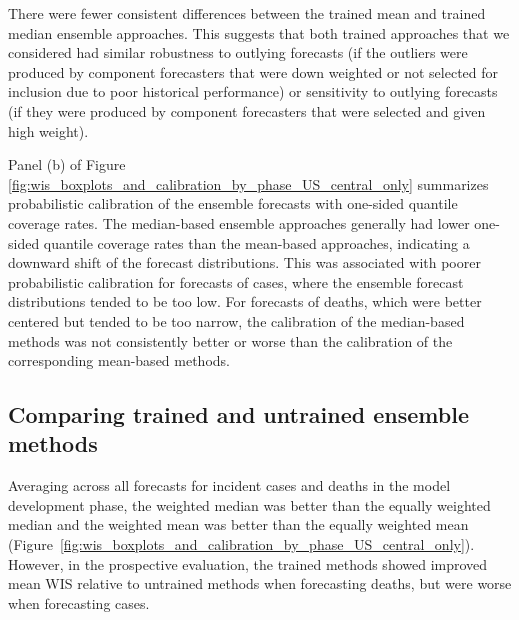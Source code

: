 \documentclass[11pt,3p,review,authoryear]{elsarticle}
\begin{document}
There were fewer consistent differences between the trained mean and trained median ensemble approaches. This suggests that both trained approaches that we considered had similar robustness to outlying forecasts (if the outliers were produced by component forecasters that were down weighted or not selected for inclusion due to poor historical performance) or sensitivity to outlying forecasts (if they were produced by component forecasters that were selected and given high weight).

Panel (b) of Figure \ref{fig:wis_boxplots_and_calibration_by_phase_US_central_only} summarizes probabilistic calibration of the ensemble forecasts with one-sided quantile coverage rates. The median-based ensemble approaches generally had lower one-sided quantile coverage rates than the mean-based approaches, indicating a downward shift of the forecast distributions. This was associated with poorer probabilistic calibration for forecasts of cases, where the ensemble forecast distributions tended to be too low. For forecasts of deaths, which were better centered but tended to be too narrow, the calibration of the median-based methods was not consistently better or worse than the calibration of the corresponding mean-based methods.

\subsection{Comparing trained and untrained ensemble methods}
\label{subsec:results_trained}

Averaging across all forecasts for incident cases and deaths in the model development phase, the weighted median was better than the equally weighted median and the weighted mean was better than the equally weighted mean (Figure~\ref{fig:wis_boxplots_and_calibration_by_phase_US_central_only}).
However, in the prospective evaluation, the trained methods showed improved mean WIS relative to untrained methods when forecasting deaths, but were worse when forecasting cases.
\end{document}
